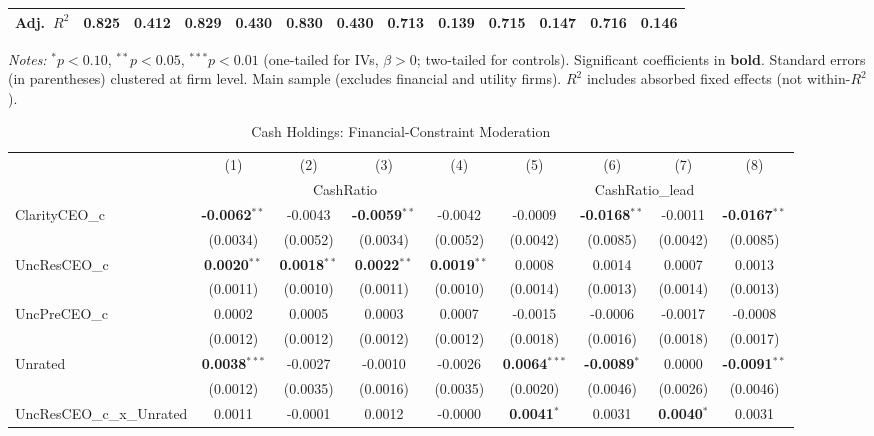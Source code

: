 \documentclass[11pt,a4paper]{article}
\begin{document}
\begin{table}[htbp]
\begin{tabular}{lcccccccccccc}
Adj.~$R^2$ & 0.825 & 0.412 & 0.829 & 0.430 & 0.830 & 0.430 & 0.713 & 0.139 & 0.715 & 0.147 & 0.716 & 0.146 \\
\bottomrule
\end{tabular}
\begin{minipage}{\linewidth}
\vspace{2pt}\scriptsize
\textit{Notes:} $^{*}p<0.10$, $^{**}p<0.05$, $^{***}p<0.01$ (one-tailed for IVs, $\beta > 0$; two-tailed for controls).
 Significant coefficients in \textbf{bold}.
 Standard errors (in parentheses) clustered at firm level.
 Main sample (excludes financial and utility firms).
 $R^2$ includes absorbed fixed effects (not within-$R^2$).
\end{minipage}
\end{table}
\clearpage
\begin{table}[htbp]
\centering
\caption{Cash Holdings: Financial-Constraint Moderation}
\label{tab:h1_2_ceo2_decomp}
\scriptsize
\begin{tabular}{lcccccccc}
\toprule
 & (1) & (2) & (3) & (4) & (5) & (6) & (7) & (8) \\
 & \multicolumn{4}{c}{CashRatio} & \multicolumn{4}{c}{CashRatio\_lead} \\
\cmidrule(lr){2-5} \cmidrule(lr){6-9}
\midrule
ClarityCEO\_c & \textbf{-0.0062}$^{**}$ & -0.0043 & \textbf{-0.0059}$^{**}$ & -0.0042 & -0.0009 & \textbf{-0.0168}$^{**}$ & -0.0011 & \textbf{-0.0167}$^{**}$ \\
 & (0.0034) & (0.0052) & (0.0034) & (0.0052) & (0.0042) & (0.0085) & (0.0042) & (0.0085) \\
UncResCEO\_c & \textbf{0.0020}$^{**}$ & \textbf{0.0018}$^{**}$ & \textbf{0.0022}$^{**}$ & \textbf{0.0019}$^{**}$ & 0.0008 & 0.0014 & 0.0007 & 0.0013 \\
 & (0.0011) & (0.0010) & (0.0011) & (0.0010) & (0.0014) & (0.0013) & (0.0014) & (0.0013) \\
UncPreCEO\_c & 0.0002 & 0.0005 & 0.0003 & 0.0007 & -0.0015 & -0.0006 & -0.0017 & -0.0008 \\
 & (0.0012) & (0.0012) & (0.0012) & (0.0012) & (0.0018) & (0.0016) & (0.0018) & (0.0017) \\
Unrated & \textbf{0.0038}$^{***}$ & -0.0027 & -0.0010 & -0.0026 & \textbf{0.0064}$^{***}$ & \textbf{-0.0089}$^{*}$ & 0.0000 & \textbf{-0.0091}$^{**}$ \\
 & (0.0012) & (0.0035) & (0.0016) & (0.0035) & (0.0020) & (0.0046) & (0.0026) & (0.0046) \\
UncResCEO\_c\_x\_Unrated & 0.0011 & -0.0001 & 0.0012 & -0.0000 & \textbf{0.0041}$^{*}$ & 0.0031 & \textbf{0.0040}$^{*}$ & 0.0031 \\

\end{tabular}
\end{table}
\end{document}

